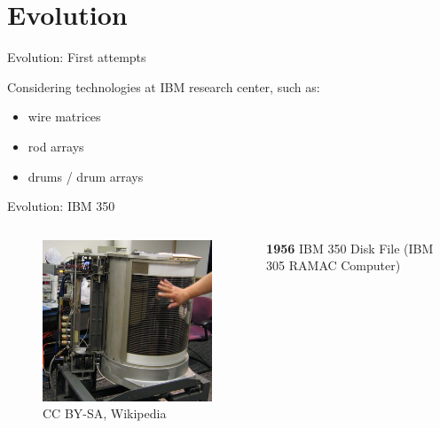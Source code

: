 \documentclass[12pt]{beamer}
\newlength{\wideitemsep}
\let\olditem\item
\renewcommand{\item}{\setlength{\itemsep}{\wideitemsep}\olditem}
\begin{document}
\section{Evolution}
\begin{frame}[fragile]{Evolution: First attempts}

	Considering technologies at IBM research center, such as:
	\begin{itemize}
		\item wire matrices
		\item rod arrays
		\item drums / drum arrays
	\end{itemize}
\end{frame}

\begin{frame}[fragile]{Evolution: IBM 350}
	\begin{columns}[c]
	\begin{column}[c]{.5\textwidth}	
 		\begin{figure}[c]
	 		\centering
	 		\includegraphics[width=\linewidth]{img/ibm_350.jpg}
	 			\caption{CC BY-SA, Wikipedia}
 		\end{figure}
 	\end{column}
 	
	\begin{column}[c]{.5\textwidth}
		\textbf{1956} IBM 350 Disk File (IBM 305 RAMAC Computer)
	\end{column}
	\end{columns}
\end{frame}
\end{document}
